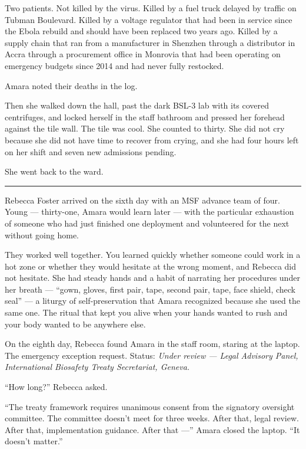 \documentclass[11pt]{article}
\begin{document}
Two patients. Not killed by the virus. Killed by a fuel truck delayed by traffic on Tubman Boulevard. Killed by a voltage regulator that had been in service since the Ebola rebuild and should have been replaced two years ago. Killed by a supply chain that ran from a manufacturer in Shenzhen through a distributor in Accra through a procurement office in Monrovia that had been operating on emergency budgets since 2014 and had never fully restocked.

Amara noted their deaths in the log.

Then she walked down the hall, past the dark BSL-3 lab with its covered centrifuges, and locked herself in the staff bathroom and pressed her forehead against the tile wall. The tile was cool. She counted to thirty. She did not cry because she did not have time to recover from crying, and she had four hours left on her shift and seven new admissions pending.

She went back to the ward.

\begin{center}\rule{0.3\linewidth}{0.4pt}\end{center}

Rebecca Foster arrived on the sixth day with an MSF advance team of four. Young --- thirty-one, Amara would learn later --- with the particular exhaustion of someone who had just finished one deployment and volunteered for the next without going home.

They worked well together. You learned quickly whether someone could work in a hot zone or whether they would hesitate at the wrong moment, and Rebecca did not hesitate. She had steady hands and a habit of narrating her procedures under her breath --- ``gown, gloves, first pair, tape, second pair, tape, face shield, check seal'' --- a liturgy of self-preservation that Amara recognized because she used the same one. The ritual that kept you alive when your hands wanted to rush and your body wanted to be anywhere else.

On the eighth day, Rebecca found Amara in the staff room, staring at the laptop. The emergency exception request. Status: \emph{Under review --- Legal Advisory Panel, International Biosafety Treaty Secretariat, Geneva.}

``How long?'' Rebecca asked.

``The treaty framework requires unanimous consent from the signatory oversight committee. The committee doesn't meet for three weeks. After that, legal review. After that, implementation guidance. After that ---'' Amara closed the laptop. ``It doesn't matter.''
\end{document}
